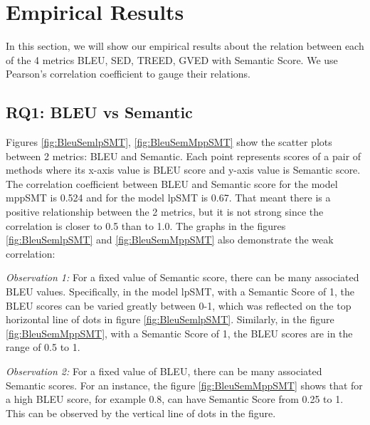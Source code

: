 \section{Empirical Results}
In this section, we will show our empirical results about the relation between each of the 4 metrics BLEU, SED, TREED, GVED with Semantic Score. We use Pearson\rq s correlation coefficient to gauge their relations. 
\subsection{RQ1: BLEU vs Semantic}
Figures \ref{fig:BleuSemlpSMT}, \ref{fig:BleuSemMppSMT}  show the scatter plots between 2 metrics: BLEU and Semantic. Each point represents scores of a pair of methods where its x-axis value is BLEU score and y-axis value is Semantic score.
The correlation coefficient between BLEU and Semantic score for the model mppSMT is 0.524 and for the model lpSMT is 0.67. That meant there is a positive relationship between the 2 metrics, but it is not strong since the correlation is closer to 0.5 than to 1.0. The graphs in the figures \ref{fig:BleuSemlpSMT} and \ref{fig:BleuSemMppSMT}  also demonstrate the weak correlation:

\emph{Observation 1:} For a fixed value of Semantic score, there can be many associated BLEU values. Specifically, in the model lpSMT, with a Semantic Score of 1, the BLEU scores can be varied greatly between 0-1, which was reflected on the top horizontal line of dots in figure \ref{fig:BleuSemlpSMT}. Similarly, in the figure \ref{fig:BleuSemMppSMT}, with a Semantic Score of 1, the BLEU scores are in the range of 0.5 to 1. 

\emph{Observation 2:} For a fixed value of BLEU, there can be many associated Semantic scores. For an instance, the figure \ref{fig:BleuSemMppSMT} shows that for a high BLEU score, for example 0.8, can have Semantic Score from 0.25 to 1. This can be observed by the vertical line of dots in the figure. 

